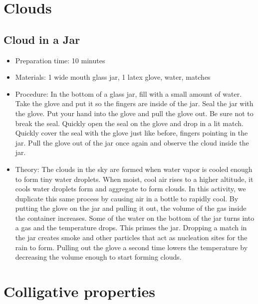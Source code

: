 \section{Clouds}

\subsection{Cloud in a Jar}
\begin{itemize}
\item{Preparation time: 10 minutes}
\item{Materials: 1 wide mouth glass jar, 1 latex glove, water, matches}
\item{Procedure: In the bottom of a glass jar, fill with a small amount of water. Take the glove and put it so the fingers are inside of the jar. Seal the jar with the glove. Put your hand into the glove and pull the glove out. Be sure not to break the seal. Quickly open the seal on the glove and drop in a lit match. Quickly cover the seal with the glove just like before, fingers pointing in the jar. Pull the glove out of the jar once again and observe the cloud inside the jar.}
\item{Theory: The clouds in the sky are formed when water vapor is cooled enough to form tiny water droplets. When moist, cool air rises to a higher altitude, it cools water droplets form and aggregate to form clouds. In this activity, we duplicate this same process by causing air in a bottle to rapidly cool. By putting the glove on the jar and pulling it out, the volume of the gas inside the container increases. Some of the water on the bottom of the jar turns into a gas and the temperature drops. This primes the jar. Dropping a match in the jar creates smoke and other particles that act as nucleation sites for the rain to form. Pulling out the glove a second time lowers the temperature by decreasing the volume enough to start forming clouds.}
\end{itemize}

\section{Colligative properties}

